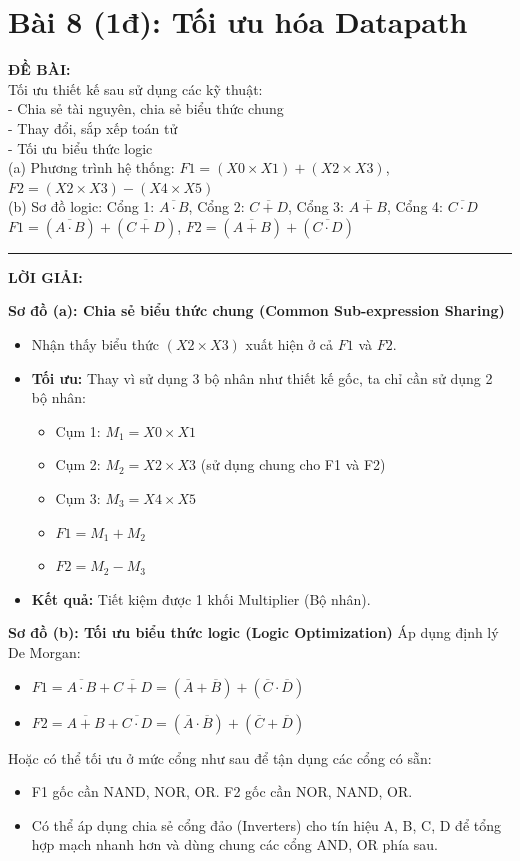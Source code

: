 \documentclass[12pt,a4paper]{article}
\begin{document}
\section{Bài 8 (1đ): Tối ưu hóa Datapath}
\textbf{ĐỀ BÀI:} \\
Tối ưu thiết kế sau sử dụng các kỹ thuật:\\
- Chia sẻ tài nguyên, chia sẻ biểu thức chung\\
- Thay đổi, sắp xếp toán tử\\
- Tối ưu biểu thức logic\\
(a) Phương trình hệ thống: $F1 = (X0 \times X1) + (X2 \times X3)$, $F2 = (X2 \times X3) - (X4 \times X5)$\\
(b) Sơ đồ logic: 
Cổng 1: $\overline{A \cdot B}$, 
Cổng 2: $\overline{C + D}$, 
Cổng 3: $\overline{A + B}$, 
Cổng 4: $\overline{C \cdot D}$\\
$F1 = (\overline{A \cdot B}) + (\overline{C + D})$, 
$F2 = (\overline{A + B}) + (\overline{C \cdot D})$

\hrule\vspace{0.5cm}
\textbf{LỜI GIẢI:}

\textbf{Sơ đồ (a): Chia sẻ biểu thức chung (Common Sub-expression Sharing)}
\begin{itemize}
    \item Nhận thấy biểu thức $(X2 \times X3)$ xuất hiện ở cả $F1$ và $F2$.
    \item \textbf{Tối ưu:} Thay vì sử dụng 3 bộ nhân như thiết kế gốc, ta chỉ cần sử dụng 2 bộ nhân:
    \begin{itemize}
        \item Cụm 1: $M_1 = X0 \times X1$
        \item Cụm 2: $M_2 = X2 \times X3$ (sử dụng chung cho F1 và F2)
        \item Cụm 3: $M_3 = X4 \times X5$
        \item $F1 = M_1 + M_2$
        \item $F2 = M_2 - M_3$
    \end{itemize}
    \item \textbf{Kết quả:} Tiết kiệm được 1 khối Multiplier (Bộ nhân).
\end{itemize}

\textbf{Sơ đồ (b): Tối ưu biểu thức logic (Logic Optimization)}
Áp dụng định lý De Morgan:
\begin{itemize}
    \item $F1 = \overline{A \cdot B} + \overline{C + D} = (\overline{A} + \overline{B}) + (\overline{C} \cdot \overline{D})$
    \item $F2 = \overline{A + B} + \overline{C \cdot D} = (\overline{A} \cdot \overline{B}) + (\overline{C} + \overline{D})$
\end{itemize}
Hoặc có thể tối ưu ở mức cổng như sau để tận dụng các cổng có sẵn:
\begin{itemize}
    \item F1 gốc cần NAND, NOR, OR. F2 gốc cần NOR, NAND, OR.
    \item Có thể áp dụng chia sẻ cổng đảo (Inverters) cho tín hiệu A, B, C, D để tổng hợp mạch nhanh hơn và dùng chung các cổng AND, OR phía sau.
\end{itemize}
\end{document}
